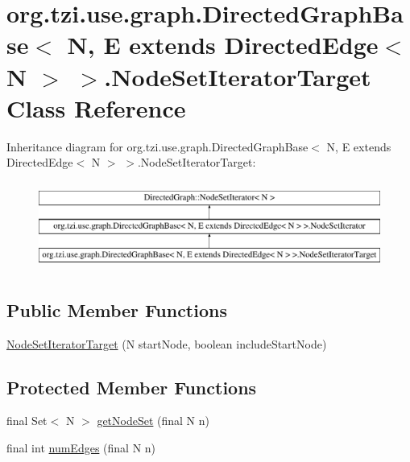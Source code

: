 \hypertarget{classorg_1_1tzi_1_1use_1_1graph_1_1_directed_graph_base_3_01_n_00_01_e_01extends_01_directed_edga0eb44a48d9f4b55d4eaf2f0e7c0b6a9}{\section{org.\-tzi.\-use.\-graph.\-Directed\-Graph\-Base$<$ N, E extends Directed\-Edge$<$ N $>$ $>$.Node\-Set\-Iterator\-Target Class Reference}
\label{classorg_1_1tzi_1_1use_1_1graph_1_1_directed_graph_base_3_01_n_00_01_e_01extends_01_directed_edga0eb44a48d9f4b55d4eaf2f0e7c0b6a9}
}
Inheritance diagram for org.\-tzi.\-use.\-graph.\-Directed\-Graph\-Base$<$ N, E extends Directed\-Edge$<$ N $>$ $>$.Node\-Set\-Iterator\-Target\-:\begin{figure}[H]
\begin{center}
\leavevmode
\includegraphics[height=2.937063cm]{classorg_1_1tzi_1_1use_1_1graph_1_1_directed_graph_base_3_01_n_00_01_e_01extends_01_directed_edga0eb44a48d9f4b55d4eaf2f0e7c0b6a9}
\end{center}
\end{figure}
\subsection*{Public Member Functions}
\begin{DoxyCompactItemize}
\item 
\hyperlink{classorg_1_1tzi_1_1use_1_1graph_1_1_directed_graph_base_3_01_n_00_01_e_01extends_01_directed_edga0eb44a48d9f4b55d4eaf2f0e7c0b6a9_aba5a2e6c06477c58e0583b6af32ecfa6}{Node\-Set\-Iterator\-Target} (N start\-Node, boolean include\-Start\-Node)
\end{DoxyCompactItemize}
\subsection*{Protected Member Functions}
\begin{DoxyCompactItemize}
\item 
final Set$<$ N $>$ \hyperlink{classorg_1_1tzi_1_1use_1_1graph_1_1_directed_graph_base_3_01_n_00_01_e_01extends_01_directed_edga0eb44a48d9f4b55d4eaf2f0e7c0b6a9_a365746e6f331e65f9ed72606ba784169}{get\-Node\-Set} (final N n)
\item 
final int \hyperlink{classorg_1_1tzi_1_1use_1_1graph_1_1_directed_graph_base_3_01_n_00_01_e_01extends_01_directed_edga0eb44a48d9f4b55d4eaf2f0e7c0b6a9_a822227425dd407c08c12de545c7075ed}{num\-Edges} (final N n)
\end{DoxyCompactItemize}


